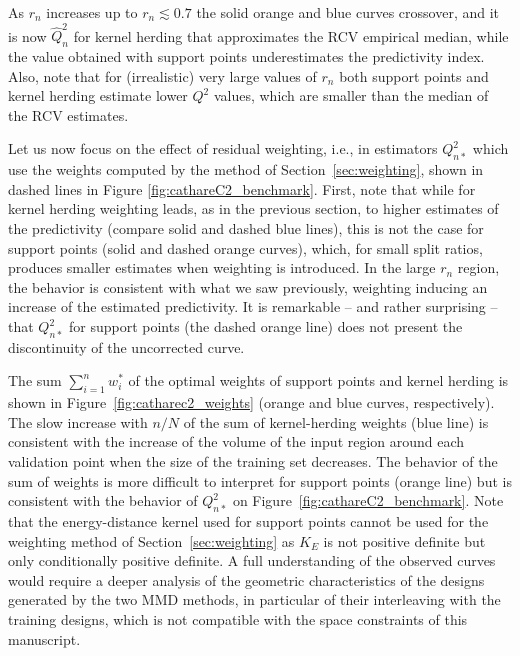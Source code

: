 As $r_n$ increases up to $r_n \lesssim 0.7$ the solid orange and blue curves crossover, and it is now $\widehat Q^2_n$ for kernel herding that approximates the RCV empirical median, while the value obtained with support points underestimates the predictivity index. 
Also, note that for (irrealistic) very large values of $r_n$ both support points and kernel herding estimate lower $Q^2$ values, which are smaller than the median of the RCV estimates.

Let us now focus on the effect of residual weighting, i.e., in estimators $Q_{n*}^2$ which use the weights computed by the method of Section~\ref{sec:weighting}, shown in dashed lines in Figure \ref{fig:cathareC2_benchmark}. 
First, note that while for kernel herding weighting leads, as in the previous section, to higher estimates of the predictivity (compare solid and dashed blue lines), this is not the case for support points (solid and dashed orange curves), which, for small split ratios, produces smaller estimates when weighting is introduced. 
In the large $r_n$ region, the behavior is consistent with what we saw previously, weighting inducing an increase of the estimated predictivity. 
It is remarkable -- and rather surprising -- that $Q_{n*}^2$ for support points (the dashed orange line) does not present the discontinuity of the uncorrected curve. 

The sum $\sum_{i=1}^n w_i^*$ of the optimal weights of support points and kernel herding  is shown in Figure~\ref{fig:catharec2_weights} (orange and blue curves, respectively). 
The slow increase with $n/N$ of the sum of kernel-herding weights (blue line) is consistent with the increase of the volume of the input region around each validation point when the size of the training set decreases. 
The behavior of the sum of weights is more difficult to interpret for support points (orange line) but is consistent with the behavior of $Q_{n*}^2$ on Figure~\ref{fig:cathareC2_benchmark}. 
Note that the energy-distance kernel  used for support points cannot be used for the weighting method of Section~\ref{sec:weighting} as $K_E$ is not positive definite but only conditionally positive definite. 
A full understanding of the observed curves would require a deeper analysis of the geometric characteristics of the designs generated by the two MMD methods, in particular of their interleaving with the training designs, which is not compatible with the space constraints of this manuscript. 

